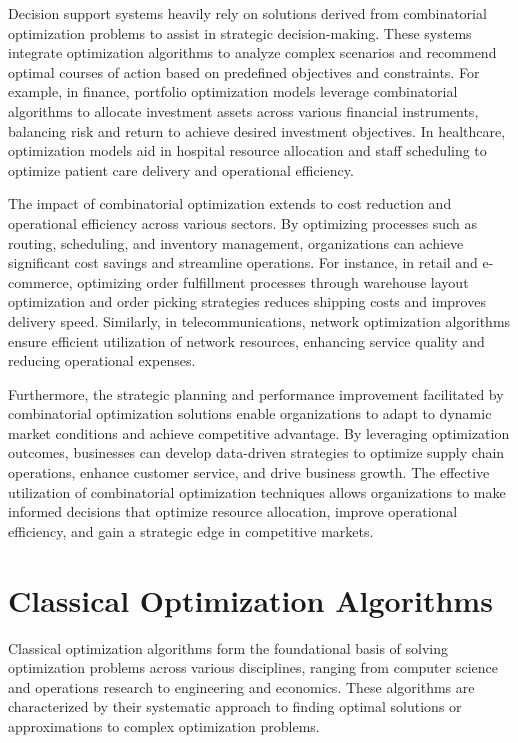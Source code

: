\documentclass[11pt]{report}
\begin{document}
        Decision support systems heavily rely on solutions derived from combinatorial optimization problems to assist in strategic decision-making. These systems integrate optimization algorithms to analyze complex scenarios and recommend optimal courses of action based on predefined objectives and constraints. For example, in finance, portfolio optimization models leverage combinatorial algorithms to allocate investment assets across various financial instruments, balancing risk and return to achieve desired investment objectives. In healthcare, optimization models aid in hospital resource allocation and staff scheduling to optimize patient care delivery and operational efficiency.
        
        The impact of combinatorial optimization extends to cost reduction and operational efficiency across various sectors. By optimizing processes such as routing, scheduling, and inventory management, organizations can achieve significant cost savings and streamline operations. For instance, in retail and e-commerce, optimizing order fulfillment processes through warehouse layout optimization and order picking strategies reduces shipping costs and improves delivery speed. Similarly, in telecommunications, network optimization algorithms ensure efficient utilization of network resources, enhancing service quality and reducing operational expenses.
        
        Furthermore, the strategic planning and performance improvement facilitated by combinatorial optimization solutions enable organizations to adapt to dynamic market conditions and achieve competitive advantage. By leveraging optimization outcomes, businesses can develop data-driven strategies to optimize supply chain operations, enhance customer service, and drive business growth. The effective utilization of combinatorial optimization techniques allows organizations to make informed decisions that optimize resource allocation, improve operational efficiency, and gain a strategic edge in competitive markets.


    \section{Classical Optimization Algorithms}

    Classical optimization algorithms form the foundational basis of solving optimization problems across various disciplines, ranging from computer science and operations research to engineering and economics. These algorithms are characterized by their systematic approach to finding optimal solutions or approximations to complex optimization problems.
\end{document}
